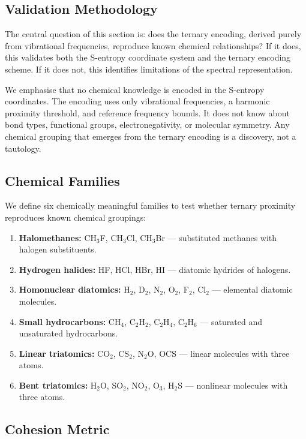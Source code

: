 \documentclass[11pt,a4paper]{article}
\theoremstyle{definition}
\theoremstyle{remark}
\begin{document}
\subsection{Validation Methodology}

The central question of this section is: does the ternary encoding, derived purely from vibrational frequencies, reproduce known chemical relationships? If it does, this validates both the S-entropy coordinate system and the ternary encoding scheme. If it does not, this identifies limitations of the spectral representation.

We emphasise that no chemical knowledge is encoded in the S-entropy coordinates. The encoding uses only vibrational frequencies, a harmonic proximity threshold, and reference frequency bounds. It does not know about bond types, functional groups, electronegativity, or molecular symmetry. Any chemical grouping that emerges from the ternary encoding is a discovery, not a tautology.

\subsection{Chemical Families}

We define six chemically meaningful families to test whether ternary proximity reproduces known chemical groupings:

\begin{enumerate}[nosep]
\item \textbf{Halomethanes:} CH$_3$F, CH$_3$Cl, CH$_3$Br --- substituted methanes with halogen substituents.
\item \textbf{Hydrogen halides:} HF, HCl, HBr, HI --- diatomic hydrides of halogens.
\item \textbf{Homonuclear diatomics:} H$_2$, D$_2$, N$_2$, O$_2$, F$_2$, Cl$_2$ --- elemental diatomic molecules.
\item \textbf{Small hydrocarbons:} CH$_4$, C$_2$H$_2$, C$_2$H$_4$, C$_2$H$_6$ --- saturated and unsaturated hydrocarbons.
\item \textbf{Linear triatomics:} CO$_2$, CS$_2$, N$_2$O, OCS --- linear molecules with three atoms.
\item \textbf{Bent triatomics:} H$_2$O, SO$_2$, NO$_2$, O$_3$, H$_2$S --- nonlinear molecules with three atoms.
\end{enumerate}

\subsection{Cohesion Metric}
\end{document}
